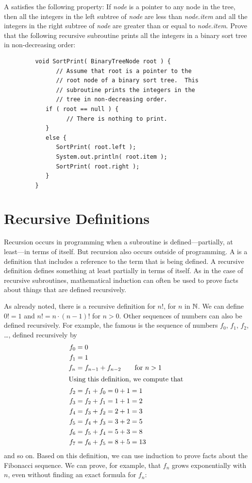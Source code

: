 \begin{exercises}
\problem A  satisfies the
following property:  If \textit{node} is a pointer to any
node in the tree, then all the integers in the left subtree
of \textit{node} are less than \textit{node.item} and
all the integers in the right subtree of \textit{node} are
greater than or equal to \textit{node.item}.  Prove that the
following recursive subroutine prints all the integers in
a binary sort tree in non-decreasing order:
\begin{verbatim}
         void SortPrint( BinaryTreeNode root ) {
               // Assume that root is a pointer to the
               // root node of a binary sort tree.  This
               // subroutine prints the integers in the
               // tree in non-decreasing order.
            if ( root == null ) {
                  // There is nothing to print.
            }
            else {
               SortPrint( root.left );
               System.out.println( root.item );
               SortPrint( root.right );
            }
         }
\end{verbatim}
\smallskip


\end{exercises}


\section{Recursive Definitions}

Recursion occurs in programming when a subroutine is defined---partially,
at least---in terms of itself.  But recursion also occurs outside of
programming.  A  is a definition that includes
a reference to the term that is being defined.  A recursive definition
defines something at least partially in terms of itself.  As in the
case of recursive subroutines, mathematical induction can often be used
to prove facts about things that are defined recursively.

As already noted, there is a recursive definition for $n!$, for $n$ in ${\mathbb N}$.  We
can define $0!=1$ and $n!=n\cdot(n-1)!$ for $n>0$.  Other sequences of
numbers can also be defined recursively.  For example, the famous
 is the sequence of numbers $f_0$, $f_1$, $f_2$, \dots,
defined recursively by
\begin{align*}
    f_0 &= 0\\
    f_1 &= 1\\
    f_n &= f_{n-1}+f_{n-2} \qquad \text{for $n>1$}\\
\intertext{Using this definition, we compute that}
    f_2 &= f_1 + f_0 = 0 + 1 = 1\\
    f_3 &= f_2 + f_1 = 1 + 1 = 2\\
    f_4 &= f_3 + f_2 = 2 + 1 = 3\\
    f_5 &= f_4 + f_3 = 3 + 2 = 5\\
    f_6 &= f_5 + f_4 = 5 + 3 = 8\\
    f_7 &= f_6 + f_5 = 8 + 5 = 13
\end{align*}
and so on.  Based on this definition, we can use induction to
prove facts about the Fibonacci sequence.  We can prove,
for example, that $f_n$ grows exponentially with $n$, even without
finding an exact formula for $f_n$:

